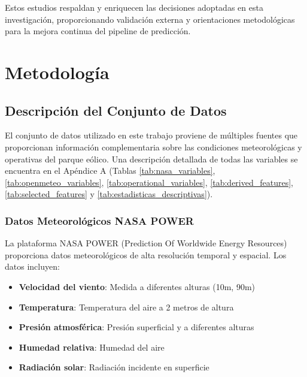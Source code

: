 \documentclass[conference]{IEEEtran}
\begin{document}
Estos estudios respaldan y enriquecen las decisiones adoptadas en esta investigación, proporcionando validación externa y orientaciones metodológicas para la mejora continua del pipeline de predicción.

	
\section{Metodología}
	
\subsection{Descripción del Conjunto de Datos}

El conjunto de datos utilizado en este trabajo proviene de múltiples fuentes que proporcionan información complementaria sobre las condiciones meteorológicas y operativas del parque eólico. Una descripción detallada de todas las variables se encuentra en el Apéndice A (Tablas \ref{tab:nasa_variables}, \ref{tab:openmeteo_variables}, \ref{tab:operational_variables}, \ref{tab:derived_features}, \ref{tab:selected_features} y \ref{tab:estadisticas_descriptivas}).
	
\subsubsection{Datos Meteorológicos NASA POWER}

La plataforma NASA POWER (Prediction Of Worldwide Energy Resources) proporciona datos meteorológicos de alta resolución temporal y espacial. Los datos incluyen:

\begin{itemize}

\item \textbf{Velocidad del viento}: Medida a diferentes alturas (10m, 90m)

\item \textbf{Temperatura}: Temperatura del aire a 2 metros de altura

\item \textbf{Presión atmosférica}: Presión superficial y a diferentes alturas

\item \textbf{Humedad relativa}: Humedad del aire

\item \textbf{Radiación solar}: Radiación incidente en superficie

\end{itemize}
	
\end{document}

